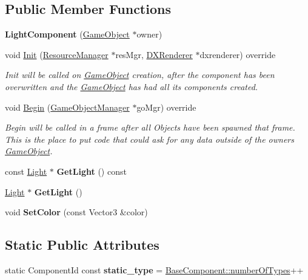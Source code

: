 \subsection*{Public Member Functions}
\begin{DoxyCompactItemize}
\item 
\mbox{\label{classLightComponent_ac374477ea9f077553f23f57313d9338d}} 
{\bfseries Light\+Component} (\hyperlink{classGameObject}{Game\+Object} $\ast$owner)
\item 
void \hyperlink{classLightComponent_abb4382140092cd7b54f3cf1d37a31c7b}{Init} (\hyperlink{classResourceManager}{Resource\+Manager} $\ast$res\+Mgr, \hyperlink{classDXRenderer}{D\+X\+Renderer} $\ast$dxrenderer) override
\begin{DoxyCompactList}\small\item\em Init will be called on \hyperlink{classGameObject}{Game\+Object} creation, after the component has been overwritten and the \hyperlink{classGameObject}{Game\+Object} has had all its components created. \end{DoxyCompactList}\item 
void \hyperlink{classLightComponent_a5cb42a615fc057b75e003e69aee729ef}{Begin} (\hyperlink{classGameObjectManager}{Game\+Object\+Manager} $\ast$go\+Mgr) override
\begin{DoxyCompactList}\small\item\em Begin will be called in a frame after all Objects have been spawned that frame. This is the place to put code that could ask for any data outside of the owner\textquotesingle{}s \hyperlink{classGameObject}{Game\+Object}. \end{DoxyCompactList}\item 
\mbox{\label{classLightComponent_ae1443763b20f9aa6167a774b193a67bd}} 
const \hyperlink{classLight}{Light} $\ast$ {\bfseries Get\+Light} () const
\item 
\mbox{\label{classLightComponent_a22972b771f48b615fab04ab09f214225}} 
\hyperlink{classLight}{Light} $\ast$ {\bfseries Get\+Light} ()
\item 
\mbox{\label{classLightComponent_ae205592af0c2e3c8578749dd7de8a496}} 
void {\bfseries Set\+Color} (const Vector3 \&color)
\end{DoxyCompactItemize}
\subsection*{Static Public Attributes}
\begin{DoxyCompactItemize}
\item 
\mbox{\label{classLightComponent_a4fa80064b4e8acd677e551783f827c56}} 
static Component\+Id const {\bfseries static\+\_\+type} = \hyperlink{classBaseComponent_a084ade347bc71a7f0d3b17ecdc2225a4}{Base\+Component\+::number\+Of\+Types}++
\end{DoxyCompactItemize}
